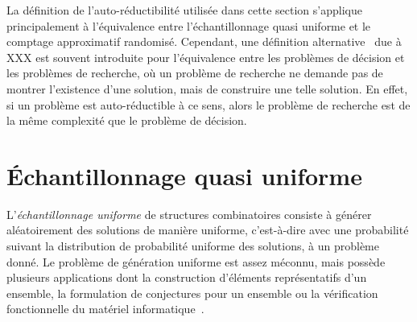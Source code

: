 La définition de l'auto-réductibilité utilisée dans cette section s'applique principalement à l'équivalence entre l'échantillonnage quasi uniforme et le comptage approximatif randomisé. Cependant, une définition alternative~\cite{goldreichComputationalComplexityConceptual2008} due à XXX est souvent introduite pour l'équivalence entre les problèmes de décision et les problèmes de recherche, où un problème de recherche ne demande pas de montrer l'existence d'une solution, mais de construire une telle solution. En effet, si un problème est auto-réductible à ce sens, alors le problème de recherche est de la même complexité que le problème de décision. 


\section{Échantillonnage quasi uniforme}
\label{sec:echantillonnage-quasi-uniforme}

L'\textit{échantillonnage uniforme} de structures combinatoires consiste à générer aléatoirement des solutions de manière uniforme, c'est-à-dire avec une probabilité suivant la distribution de probabilité uniforme des solutions, à un problème donné. Le problème de génération uniforme est assez méconnu, mais possède plusieurs applications dont la construction d'éléments représentatifs d'un ensemble, la formulation de conjectures pour un ensemble ou la vérification fonctionnelle du matériel informatique~\cite{jerrumFastUniformGeneration1990, chakrabortyScalableNearlyUniform2013}.

